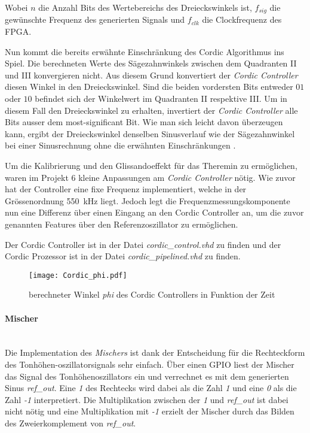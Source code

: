 Wobei \(n\) die Anzahl Bits des Wertebereichs des Dreieckswinkels ist, \(f_{sig}\) die gewünschte Frequenz des generierten Signals und \(f_{clk}\) die Clockfrequenz des FPGA.

Nun kommt die bereits erwähnte Einschränkung des Cordic Algorithmus ins Spiel. Die berechneten Werte des Sägezahnwinkels zwischen dem Quadranten II und III konvergieren nicht. Aus diesem Grund konvertiert der \textit{Cordic Controller} diesen Winkel in den Dreieckswinkel. Sind die beiden vordersten Bits entweder \(01\) oder \(10\) befindet sich der Winkelwert im Quadranten II respektive III. Um in diesem Fall den Dreieckswinkel zu erhalten, invertiert der \textit{Cordic Controller} alle Bits ausser dem most-significant Bit. Wie man sich leicht davon überzeugen kann, ergibt der Dreieckswinkel denselben Sinusverlauf wie der Sägezahnwinkel bei einer Sinusrechnung ohne die erwähnten Einschränkungen \cite{Cordic}.

Um die Kalibrierung und den Glissandoeffekt für das Theremin zu ermöglichen, waren im Projekt 6 kleine Anpassungen am \textit{Cordic Controller} nötig. Wie zuvor hat der Controller eine fixe Frequenz implementiert, welche in der Grössenordnung \SI{550}{kHz} liegt. Jedoch legt die Frequenzmessungskomponente nun eine Differenz über einen Eingang an den Cordic Controller an, um die zuvor genannten Features über den Referenzoszillator zu ermöglichen.

Der Cordic Controller ist in der Datei \textit{cordic\_control.vhd} zu finden und der Cordic Prozessor ist in der Datei \textit{cordic\_pipelined.vhd} zu finden.


\begin{figure}[t]
	\centering
	\texttt{[image: Cordic\_phi.pdf]}
	\caption{berechneter Winkel \textit{phi} des Cordic Controllers in Funktion der Zeit} 
	\label{img:Cordic_phi}
\end{figure}  


\paragraph{Mischer}\mbox{}\\

Die Implementation des \textit{Mischers} ist dank der Entscheidung für die Rechteckform des Tonhöhen-oszillatorsignals sehr einfach. Über einen GPIO liest der Mischer das Signal des Tonhöhenoszillators ein und verrechnet es mit dem generierten Sinus \textit{ref\_out}. Eine \textit{1} des Rechtecks wird dabei als die Zahl \textit{1} und eine \textit{0} als die Zahl \textit{-1} interpretiert. Die Multiplikation zwischen der \textit{1} und \textit{ref\_out} ist dabei nicht nötig und eine Multiplikation mit \textit{-1} erzielt der Mischer durch das Bilden des Zweierkomplement von \textit{ref\_out}.

